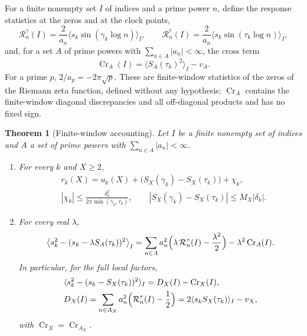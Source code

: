 \documentclass[preprint,12pt]{elsarticle}
\numberwithin{equation}{section}
\theoremstyle{plain}
\newtheorem{theorem}{Theorem}[section]
\theoremstyle{definition}
\theoremstyle{remark}
\newcommand{\Cr}{\operatorname{Cr}}
\newcommand{\Rg}{\mathcal R^{\gamma}}
\newcommand{\Rt}{\mathcal R^{\tau}}
\begin{document}
For a finite nonempty set $I$ of indices and a prime power $n$, define the response statistics at the zeros and at the clock points,
\begin{equation}
\Rg_n(I)=\frac{2}{a_n}\langle s_k\sin(\gamma_k\log n)\rangle_I,\qquad
\Rt_n(I)=\frac{2}{a_n}\langle s_k\sin(\tau_k\log n)\rangle_I,
\label{eq:two_responses}
\end{equation}
and, for a set $A$ of prime powers with $\sum_{n\in A}|a_n|<\infty$, the cross term
\begin{equation}
\Cr_A(I)=\langle S_A(\tau_k)^2\rangle_I-v_A .
\label{eq:Cr_def}
\end{equation}
For a prime $p$, $2/a_p=-2\pi\sqrt p$. These are finite-window statistics of the zeros of the Riemann zeta function, defined without any hypothesis; $\Cr_A$ contains the finite-window diagonal discrepancies and all off-diagonal products and has no fixed sign.

\begin{theorem}[Finite-window accounting]\label{thm:accounting}
Let $I$ be a finite nonempty set of indices and $A$ a set of prime powers with $\sum_{n\in A}|a_n|<\infty$.
\begin{enumerate}[label=(\alph*),leftmargin=2em]
\item For every $k$ and $X\ge2$,
\begin{equation}
\begin{split}
&r_k(X)=u_k(X)+\bigl(S_X(\gamma_k)-S_X(\tau_k)\bigr)+\chi_k,\\
&|\chi_k|\le\frac{\delta_k^2}{2\pi\min(\gamma_k,\tau_k)},\qquad|S_X(\gamma_k)-S_X(\tau_k)|\le M_X|\delta_k|.
\end{split}
\label{eq:one_step_decomposition}
\end{equation}
\item For every real $\lambda$,
\begin{equation}
\left\langle s_k^2-(s_k-\lambda S_A(\tau_k))^2\right\rangle_I
=\sum_{n\in A}a_n^2\Bigl(\lambda\,\Rt_n(I)-\frac{\lambda^2}{2}\Bigr)-\lambda^2\Cr_A(I).
\label{eq:exact_gain}
\end{equation}
In particular, for the full local factors,
\begin{equation}
\begin{split}
&\langle s_k^2-(s_k-S_X(\tau_k))^2\rangle_I=D_X(I)-\Cr_X(I),\\
&D_X(I)=\sum_{n\in A_X}a_n^2\Bigl(\Rt_n(I)-\frac12\Bigr)=2\langle s_kS_X(\tau_k)\rangle_I-v_X,
\end{split}
\label{eq:full_factor_gain}
\end{equation}
with $\Cr_X=\Cr_{A_X}$.
\end{enumerate}
\end{theorem}
\end{document}
